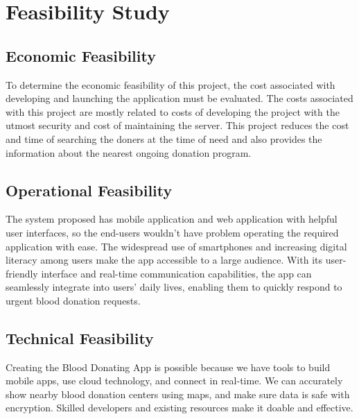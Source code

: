 \section{Feasibility Study}
\subsection{Economic Feasibility}
To determine the economic feasibility of this project, the cost associated with developing and launching the application must be evaluated. The costs associated with this project are mostly related to costs of developing the project with the utmost security and cost of maintaining the server. This project reduces the cost and time of searching the doners at the time of need and also provides the information about the nearest ongoing donation program.

\subsection{Operational Feasibility}
The system proposed has mobile application and web application with helpful user interfaces, so the end-users wouldn't have problem operating the required application with ease. The widespread use of smartphones and increasing digital literacy among users make the app accessible to a large audience. With its user-friendly interface and real-time communication capabilities, the app can seamlessly integrate into users' daily lives, enabling them to quickly respond to urgent blood donation requests.

\subsection{Technical Feasibility}
Creating the Blood Donating App is possible because we have tools to build mobile apps, use cloud technology, and connect in real-time. We can accurately show nearby blood donation centers using maps, and make sure data is safe with encryption. Skilled developers and existing resources make it doable and effective.





